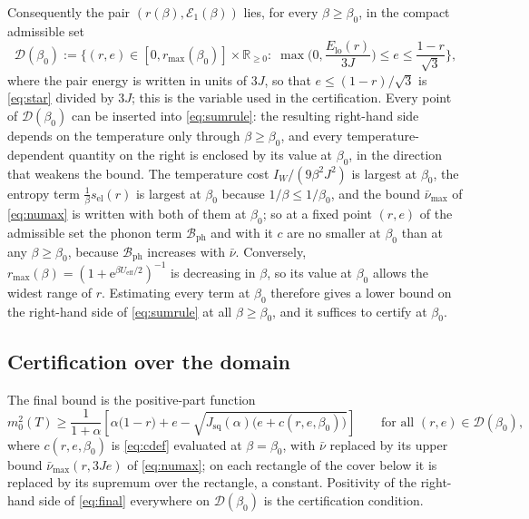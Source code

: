 \documentclass[11pt]{article}
\numberwithin{equation}{section}
\newcommand{\e}{\mathrm{e}}
\newcommand{\R}{\mathbb{R}}
\newcommand{\ph}{\mathrm{ph}}
\newcommand{\eff}{\mathrm{eff}}
\theoremstyle{definition}
\begin{document}
Consequently the pair $(r(\beta),\mathcal{E}_{1}(\beta))$ lies, for every
$\beta\ge\beta_0$, in the compact admissible set
\begin{equation}
\mathcal{D}(\beta_0):=\Big\{(r,e)\in[0,r_{\max}(\beta_0)]\times\R_{\ge0}:\;\max\Big(0,\frac{E_{\mathrm{lo}}(r)}{3J}\Big)\le e\le\frac{1-r}{\sqrt3}\Big\},
\label{eq:domain}
\end{equation}
where the pair energy is written in units of $3J$, so that $e\le(1-r)/\sqrt3$ is
\eqref{eq:star} divided by $3J$; this is the variable used in the certification. Every
point of $\mathcal{D}(\beta_0)$ can be inserted into \eqref{eq:sumrule}: the resulting
right-hand side depends on the temperature only through $\beta\ge\beta_0$, and every
temperature-dependent quantity on the right is enclosed by its value at $\beta_0$, in the
direction that weakens the bound. The temperature cost $I_{W}/(9\beta^{2}J^{2})$ is
largest at $\beta_0$, the entropy term $\frac{1}{\beta}s_{\mathrm{el}}(r)$ is largest at
$\beta_0$ because $1/\beta\le1/\beta_0$, and the bound $\bar\nu_{\max}$ of \eqref{eq:numax}
is written with both of them at $\beta_0$; so at a fixed point $(r,e)$ of the admissible
set the phonon term $\mathcal{B}_{\ph}$ and with it $c$ are no smaller at $\beta_0$ than at
any $\beta\ge\beta_0$, because $\mathcal{B}_{\ph}$ increases with $\bar\nu$. Conversely,
$r_{\max}(\beta)=(1+\e^{\beta U_{\eff}/2})^{-1}$ is decreasing in $\beta$, so its value at
$\beta_0$ allows the widest range of $r$. Estimating every term at $\beta_0$ therefore
gives a lower bound on the right-hand side of \eqref{eq:sumrule} at all
$\beta\ge\beta_0$, and it suffices to certify at $\beta_0$.

\subsection{Certification over the domain}

The final bound is the positive-part function
\begin{equation}
m_{0}^{2}(T)\ge\frac{1}{1+\alpha}\left[\alpha\big(1-r\big)+e-\sqrt{J_{\mathrm{sq}}(\alpha)\big(e+c(r,e,\beta_0)\big)}\right]
\qquad\text{for all }(r,e)\in\mathcal{D}(\beta_0),
\label{eq:final}
\end{equation}
where $c(r,e,\beta_0)$ is \eqref{eq:cdef} evaluated at $\beta=\beta_0$, with $\bar\nu$ replaced by
its upper bound $\bar\nu_{\max}(r,3Je)$ of \eqref{eq:numax}; on each rectangle of the cover
below it is replaced by its supremum over the rectangle, a constant. Positivity of the right-hand side of \eqref{eq:final} everywhere on
$\mathcal{D}(\beta_0)$ is the certification condition.
\end{document}
